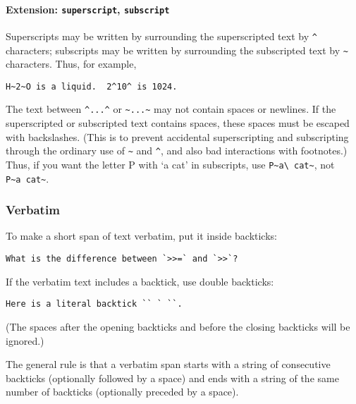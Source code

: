 \documentclass[
]{article}
\begin{document}
\hypertarget{extension-superscript-subscript}{%
\paragraph{\texorpdfstring{Extension: \texttt{superscript},
\texttt{subscript}}{Extension: superscript, subscript}}\label{extension-superscript-subscript}}

Superscripts may be written by surrounding the superscripted text by
\texttt{\^{}} characters; subscripts may be written by surrounding the
subscripted text by \texttt{\textasciitilde{}} characters. Thus, for
example,

\begin{verbatim}
H~2~O is a liquid.  2^10^ is 1024.
\end{verbatim}

The text between \texttt{\^{}...\^{}} or
\texttt{\textasciitilde{}...\textasciitilde{}} may not contain spaces or
newlines. If the superscripted or subscripted text contains spaces,
these spaces must be escaped with backslashes. (This is to prevent
accidental superscripting and subscripting through the ordinary use of
\texttt{\textasciitilde{}} and \texttt{\^{}}, and also bad interactions
with footnotes.) Thus, if you want the letter P with `a cat' in
subscripts, use
\texttt{P\textasciitilde{}a\textbackslash{}\ cat\textasciitilde{}}, not
\texttt{P\textasciitilde{}a\ cat\textasciitilde{}}.

\hypertarget{verbatim}{%
\subsubsection{Verbatim}\label{verbatim}}

To make a short span of text verbatim, put it inside backticks:

\begin{verbatim}
What is the difference between `>>=` and `>>`?
\end{verbatim}

If the verbatim text includes a backtick, use double backticks:

\begin{verbatim}
Here is a literal backtick `` ` ``.
\end{verbatim}

(The spaces after the opening backticks and before the closing backticks
will be ignored.)

The general rule is that a verbatim span starts with a string of
consecutive backticks (optionally followed by a space) and ends with a
string of the same number of backticks (optionally preceded by a space).
\end{document}
